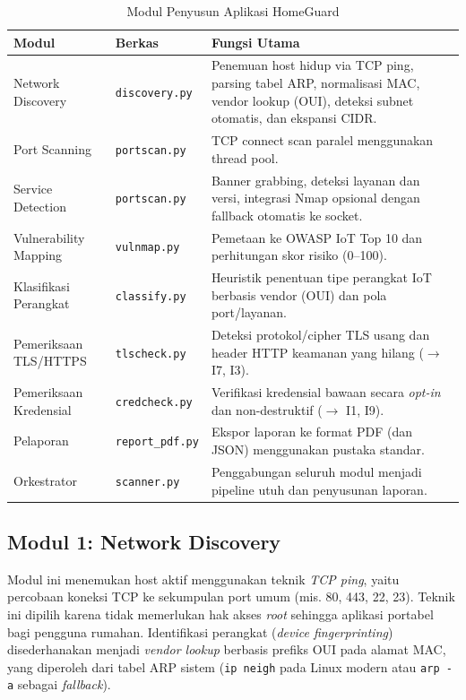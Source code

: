 \documentclass[conference]{IEEEtran}
\begin{document}
\begin{table}[htbp]
\caption{Modul Penyusun Aplikasi HomeGuard}
\label{tab:modul}
\renewcommand{\arraystretch}{1.2}
\begin{tabularx}{\columnwidth}{|l|l|X|}
\hline
\textbf{Modul} & \textbf{Berkas} & \textbf{Fungsi Utama} \\
\hline
Network Discovery & \texttt{discovery.py} & Penemuan host hidup via TCP ping, parsing tabel ARP, normalisasi MAC, vendor lookup (OUI), deteksi subnet otomatis, dan ekspansi CIDR. \\
\hline
Port Scanning & \texttt{portscan.py} & TCP connect scan paralel menggunakan thread pool. \\
\hline
Service Detection & \texttt{portscan.py} & Banner grabbing, deteksi layanan dan versi, integrasi Nmap opsional dengan fallback otomatis ke socket. \\
\hline
Vulnerability Mapping & \texttt{vulnmap.py} & Pemetaan ke OWASP IoT Top 10 dan perhitungan skor risiko (0--100). \\
\hline
Klasifikasi Perangkat & \texttt{classify.py} & Heuristik penentuan tipe perangkat IoT berbasis vendor (OUI) dan pola port/layanan. \\
\hline
Pemeriksaan TLS/HTTPS & \texttt{tlscheck.py} & Deteksi protokol/cipher TLS usang dan header HTTP keamanan yang hilang ($\to$ I7, I3). \\
\hline
Pemeriksaan Kredensial & \texttt{credcheck.py} & Verifikasi kredensial bawaan secara \textit{opt-in} dan non-destruktif ($\to$ I1, I9). \\
\hline
Pelaporan & \texttt{report\_pdf.py} & Ekspor laporan ke format PDF (dan JSON) menggunakan pustaka standar. \\
\hline
Orkestrator & \texttt{scanner.py} & Penggabungan seluruh modul menjadi pipeline utuh dan penyusunan laporan. \\
\hline
\end{tabularx}
\end{table}

\subsection{Modul 1: Network Discovery}

Modul ini menemukan host aktif menggunakan teknik \textit{TCP ping}, yaitu percobaan koneksi TCP ke sekumpulan port umum (mis. 80, 443, 22, 23). Teknik ini dipilih karena tidak memerlukan hak akses \textit{root} sehingga aplikasi portabel bagi pengguna rumahan. Identifikasi perangkat (\textit{device fingerprinting}) disederhanakan menjadi \textit{vendor lookup} berbasis prefiks OUI pada alamat MAC, yang diperoleh dari tabel ARP sistem (\texttt{ip neigh} pada Linux modern atau \texttt{arp -a} sebagai \textit{fallback}).
\end{document}

